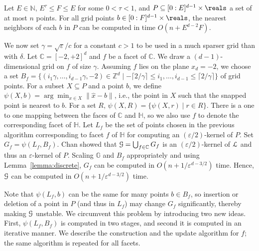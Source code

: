 \documentclass[11pt]{myclass}
\newcommand{\eps}{\varepsilon}
\renewcommand{\b}[1]{\ensuremath{\mathbb{#1}}}
\def\grid{\mathbb{G}}
\def\hcube{\mathbb{H}}
\def\excube{\mathbb{C}}
\def\naturals{\mathbb{N}}
\def\G{\EuScript{G}}
\def\wkernel{\EuScript{L}}
\def\nbr{\psi}
\def\ceil#1{\lceil#1\rceil}
\begin{document}
\begin{lemma}
\label{lemma:discrete}
Let $E \in \naturals$, $E^\tau \le F \le E$ for some $0 < \tau < 1$, and
$P \subseteq [0:E]^{d-1}\times\reals$ a set of at most $n$ points. For all grid points $b \in [0:F]^{d-1}\times\reals$, the nearest
neighbors of each $b$ in $P$ can be computed in time $O(n + E^{d-2}F)$.
\end{lemma}

We now set $\gamma = \sqrt{\eps}/c$ for a constant $c > 1$ to be used in a much sparser grid than with $\delta$. 
Let $\excube =[-2,+2]^d$ and $f$ be a facet of $\excube$. 
We draw a $(d-1)$-dimensional grid on $f$ of size $\gamma$. 
Assuming $f$ lies on the plane $x_d=-2$, we choose a set $B_f = \{ (i_1\gamma,\ldots,i_{d-1}\gamma,-2) \in \b{Z}^d \mid -\ceil{2/\gamma} \le i_1,\ldots,i_{d-1} \le \ceil{2/\gamma}\}$ of grid points.
For a subset $X \subseteq P$ and a point $b$, we define $\nbr(X,b) = \arg\min_{x\in X} \|\hat{x}-b\|$, i.e., the point in $X$ such that the snapped point is nearest to $b$. 
For a set $R$, $\nbr(X,R) = \{ \nbr(X,r) \mid r \in R\}$. 
There is a one to one mapping between the faces of $\excube$ and $\hcube$, so we also use $f$ to denote the corresponding facet of $\hcube$. 
Let $L_f$ be the set of points chosen in the previous algorithm corresponding to facet $f$ of $\hcube$ for computing an $(\eps/2)$-kernel of $P$. 
Set $G_f = \nbr(L_f,B_f)$.  
Chan showed that $\G = \bigcup_{f \in \excube} G_f$ is an $(\eps/2)$-kernel of $\wkernel$ and thus an $\eps$-kernel of $P$. 
Scaling $\grid$ and $B_f$ appropriately and using Lemma~\ref{lemma:discrete}, $G_f$ can be computed in $O(n + 1/\eps^{d-3/2})$ time. Hence, $\G$ can be computed in $O(n+1/\eps^{d-3/2})$ time.

Note that $\nbr(L_f,b)$ can be the same for many points $b\in B_f$, so 
insertion or deletion of a point in $P$ (and thus in $L_f$) may change
$G_f$ significantly, thereby making $\G$ unstable. We circumvent this problem by introducing two new ideas. First, $\nbr(L_f,B_f)$ is computed 
in two 
stages, and second it is computed in an iterative manner. We describe the 
construction and the update algorithm for $f$; the same algorithm is repeated
for all facets. 
\end{document}
